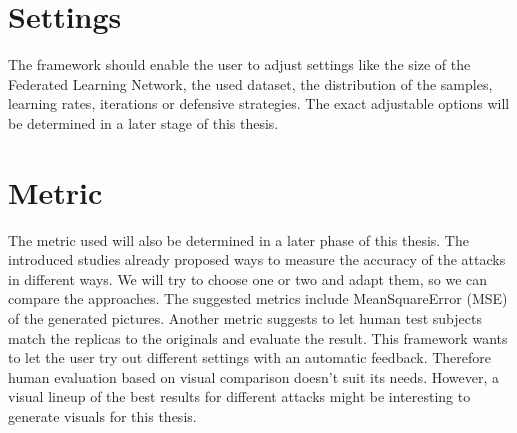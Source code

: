 \documentclass[
	ngerman,
	ruledheaders=section,%
	class=report,%
	thesis={type=bachelor},%
	accentcolor=1b,%
	custommargins=true,%
	marginpar=false,%
	parskip=half-,%
	fontsize=11pt,%
]{tudapub}
\begin{document}
\section{Settings}
The framework should enable the user to adjust settings like the size of the Federated Learning Network, the used dataset, the distribution of the samples, learning rates, iterations or defensive strategies. The exact adjustable options will be determined in a later stage of this thesis.



\section{Metric}
The metric used will also be determined in a later phase of this thesis. The introduced studies already proposed ways to measure the accuracy of the attacks in different ways. We will try to choose one or two and adapt them, so we can compare the approaches. The suggested metrics include MeanSquareError (MSE) of the generated pictures. Another metric suggests to let human test subjects match the replicas to the originals and evaluate the result. This framework wants to let the user try out different settings with an automatic feedback. Therefore human evaluation based on visual comparison doesn't suit its needs. However, a visual lineup of the best results for different attacks might be interesting to generate visuals for this thesis.




\printbibliography
\end{document}
